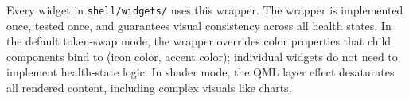 \documentclass[11pt,a4paper]{article}
\begin{document}
Every widget in \texttt{shell/widgets/} uses this wrapper. The wrapper is implemented once, tested once, and guarantees visual consistency across all health states. In the default token-swap mode, the wrapper overrides color properties that child components bind to (icon color, accent color); individual widgets do not need to implement health-state logic. In shader mode, the QML layer effect desaturates all rendered content, including complex visuals like charts.
\end{document}
